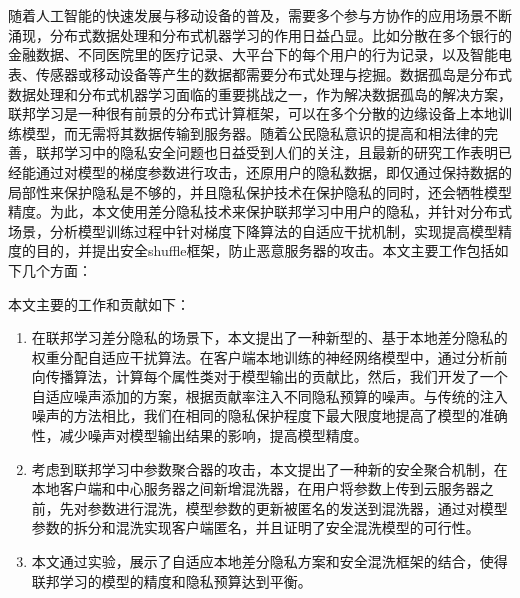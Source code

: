 \vspace{-2.5cm}
\chapter*{}

随着人工智能的快速发展与移动设备的普及，需要多个参与方协作的应用场景不断涌现，分布式数据处理和分布式机器学习的作用日益凸显。比如分散在多个银行的金融数据、不同医院里的医疗记录、大平台下的每个用户的行为记录，以及智能电表、传感器或移动设备等产生的数据都需要分布式处理与挖掘。数据孤岛是分布式数据处理和分布式机器学习面临的重要挑战之一，作为解决数据孤岛的解决方案，联邦学习是一种很有前景的分布式计算框架，可以在多个分散的边缘设备上本地训练模型，而无需将其数据传输到服务器。随着公民隐私意识的提高和相法律的完善，联邦学习中的隐私安全问题也日益受到人们的关注，且最新的研究工作表明已经能通过对模型的梯度参数进行攻击，还原用户的隐私数据，即仅通过保持数据的局部性来保护隐私是不够的，并且隐私保护技术在保护隐私的同时，还会牺牲模型精度。为此，本文使用差分隐私技术来保护联邦学习中用户的隐私，并针对分布式场景，分析模型训练过程中针对梯度下降算法的自适应干扰机制，实现提高模型精度的目的，并提出安全shuffle框架，防止恶意服务器的攻击。本文主要工作包括如下几个方面：

本文主要的工作和贡献如下：
\begin{enumerate}
\item 在联邦学习差分隐私的场景下，本文提出了一种新型的、基于本地差分隐私的权重分配自适应干扰算法。在客户端本地训练的神经网络模型中，通过分析前向传播算法，计算每个属性类对于模型输出的贡献比，然后，我们开发了一个自适应噪声添加的方案，根据贡献率注入不同隐私预算的噪声。与传统的注入噪声的方法相比，我们在相同的隐私保护程度下最大限度地提高了模型的准确性，减少噪声对模型输出结果的影响，提高模型精度。
\item 考虑到联邦学习中参数聚合器的攻击，本文提出了一种新的安全聚合机制，在本地客户端和中心服务器之间新增混洗器，在用户将参数上传到云服务器之前，先对参数进行混洗，模型参数的更新被匿名的发送到混洗器，通过对模型参数的拆分和混洗实现客户端匿名，并且证明了安全混洗模型的可行性。
\item 本文通过实验，展示了自适应本地差分隐私方案和安全混洗框架的结合，使得联邦学习的模型的精度和隐私预算达到平衡。
\end{enumerate}
\hspace{-0.5cm}
 
